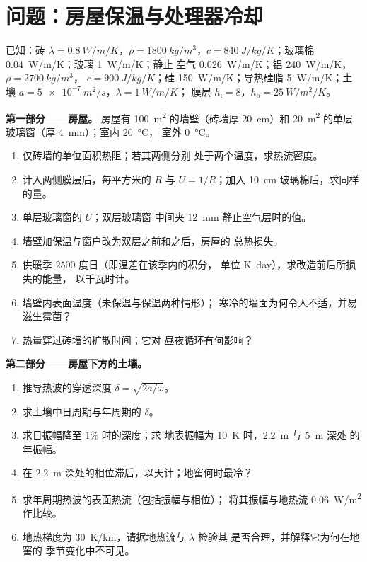 \section{问题：房屋保温与处理器冷却}

\begin{problem}\label{pb:b2:heat-conduction:1}
已知：砖 $\lambda = \qty{0.8}{W/m/K}$，$\rho = \qty{1800}{kg/m^3}$，$c =
\qty{840}{J/kg/K}$；玻璃棉 \qty{0.04}{W/m/K}；玻璃 \qty{1}{W/m/K}；静止
空气 \qty{0.026}{W/m/K}；铝 \qty{240}{W/m/K}，$\rho = \qty{2700}{kg/m^3}$，
$c = \qty{900}{J/kg/K}$；硅 \qty{150}{W/m/K}；导热硅脂
\qty{5}{W/m/K}；土壤 $a = \qty{5e-7}{m^2/s}$，$\lambda = \qty{1}{W/m/K}$；
膜层 $h_{\text{i}} = 8$，$h_{\text{o}} = \qty{25}{W/m^2/K}$。

\textbf{第一部分——房屋。}
房屋有 \qty{100}{m^2} 的墙壁（砖墙厚 \qty{20}{cm}）和 \qty{20}{m^2}
的单层玻璃窗（厚 \qty{4}{mm}）；室内 \qty{20}{\celsius}，
室外 \qty{0}{\celsius}。
\begin{enumerate}
  \item 仅砖墙的单位面积热阻；若其两侧分别
        处于两个温度，求热流密度。
  \item 计入两侧膜层后，每平方米的 $R$ 与 $U = 1/R$；加入
        \qty{10}{cm} 玻璃棉后，求同样的量。
  \item 单层玻璃窗的 $U$；双层玻璃窗
        中间夹 \qty{12}{mm} 静止空气层时的值。
  \item 墙壁加保温与窗户改为双层之前和之后，房屋的
        总热损失。
  \item 供暖季 $2500$ 度日（即温差在该季内的积分，
        单位 \unit{K.day}），求改造前后所损失的能量，
        以千瓦时计。
  \item 墙壁内表面温度（未保温与保温两种情形）；
        寒冷的墙面为何令人不适，并易滋生霉菌？
  \item 热量穿过砖墙的扩散时间；它对
        昼夜循环有何影响？
\end{enumerate}

\textbf{第二部分——房屋下方的土壤。}
\begin{enumerate}[resume]
  \item 推导热波的穿透深度
        $\delta = \sqrt{2a/\omega}$。
  \item 求土壤中日周期与年周期的 $\delta$。
  \item 求日振幅降至 $1\%$ 时的深度；求
        地表振幅为 \qty{10}{K} 时，\qty{2.2}{m} 与 \qty{5}{m} 深处
        的年振幅。
  \item 在 \qty{2.2}{m} 深处的相位滞后，以天计；地窖何时最冷？
  \item 求年周期热波的表面热流（包括振幅与相位）；
        将其振幅与地热流 \qty{0.06}{W/m^2} 作比较。
  \item 地热梯度为 \qty{30}{K/km}，请据地热流与 $\lambda$ 检验其
        是否合理，并解释它为何在地窖的
        季节变化中不可见。
\end{enumerate}


\end{problem}
